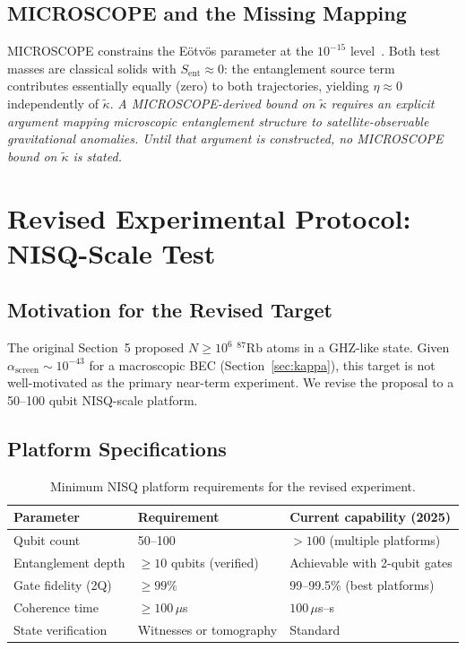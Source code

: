 \documentclass[12pt,letterpaper]{article}
\theoremstyle{plain}
\theoremstyle{definition}
\theoremstyle{remark}
\newcommand{\kt}{\tilde{\kappa}}
\newcommand{\Sent}{S_{\mathrm{ent}}}
\newcommand{\asc}{\alpha_{\mathrm{screen}}}
\begin{document}
\subsection{MICROSCOPE and the Missing Mapping}
\label{ssec:microscope}

MICROSCOPE constrains the E\"{o}tv\"{o}s parameter at the $10^{-15}$ level~\cite{MICROSCOPE2022}.
Both test masses are classical solids with $\Sent \approx 0$: the entanglement source term
contributes essentially equally (zero) to both trajectories, yielding $\eta \approx 0$
independently of $\kt$.  \emph{A MICROSCOPE-derived bound on $\kt$ requires an explicit
argument mapping microscopic entanglement structure to satellite-observable gravitational
anomalies.  Until that argument is constructed, no MICROSCOPE bound on $\kt$ is stated.}

\section{Revised Experimental Protocol: NISQ-Scale Test}
\label{sec:experiment}

\subsection{Motivation for the Revised Target}

The original Section~5 proposed $N \geq 10^{6}$ $^{87}$Rb atoms in a GHZ-like state.  Given
$\asc \sim 10^{-43}$ for a macroscopic BEC (Section~\ref{sec:kappa}), this target is not
well-motivated as the primary near-term experiment.  We revise the proposal to a 50--100 qubit
NISQ-scale platform.

\subsection{Platform Specifications}

\begin{table}[ht]
\centering\small
\caption{Minimum NISQ platform requirements for the revised experiment.}
\label{tab:nisq}
\begin{tabular}{@{}lp{3.5cm}p{4cm}@{}}
\toprule
Parameter & Requirement & Current capability (2025) \\
\midrule
Qubit count & 50--100 & $>100$ (multiple platforms) \\
Entanglement depth & $\geq 10$ qubits (verified) & Achievable with 2-qubit gates \\
Gate fidelity (2Q) & $\geq 99\%$ & 99--99.5\% (best platforms) \\
Coherence time & $\geq 100\,\mu$s & $100\,\mu$s--s \\
State verification & Witnesses or tomography & Standard \\
\bottomrule
\end{tabular}
\end{table}
\end{document}
